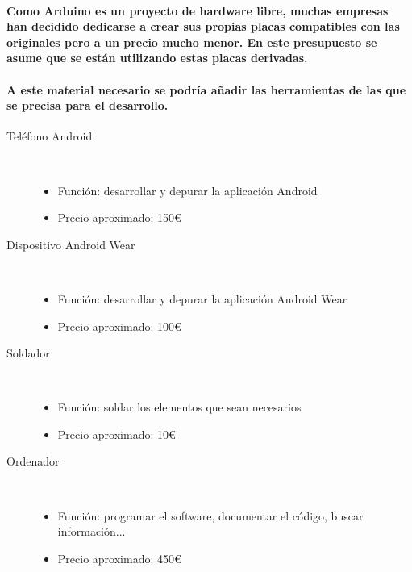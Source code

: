 \paragraph{
Como Arduino es un proyecto de hardware libre, muchas empresas han decidido
dedicarse a crear sus propias placas compatibles con las originales pero a un
precio mucho menor. En este presupuesto se asume que se están utilizando estas
placas derivadas.
}

\paragraph{
A este material necesario se podría añadir las herramientas de las que se precisa
para el desarrollo.
}
\begin{description}
  \item [Teléfono Android]\hfill \\
    \begin{itemize}
      \item {Función: desarrollar y depurar la aplicación Android}
      \item {Precio aproximado: 150\euro}
    \end{itemize}
  \item [Dispositivo Android Wear]\hfill \\
    \begin{itemize}
      \item {Función: desarrollar y depurar la aplicación Android Wear}
      \item {Precio aproximado: 100\euro}
    \end{itemize}
  \item [Soldador]\hfill \\
    \begin{itemize}
      \item {Función: soldar los elementos que sean necesarios}
      \item {Precio aproximado: 10\euro}
    \end{itemize}
    \item [Ordenador]\hfill \\
      \begin{itemize}
        \item {Función: programar el software, documentar el código, buscar información...}
        \item {Precio aproximado: 450\euro}
      \end{itemize}
\end{description}

